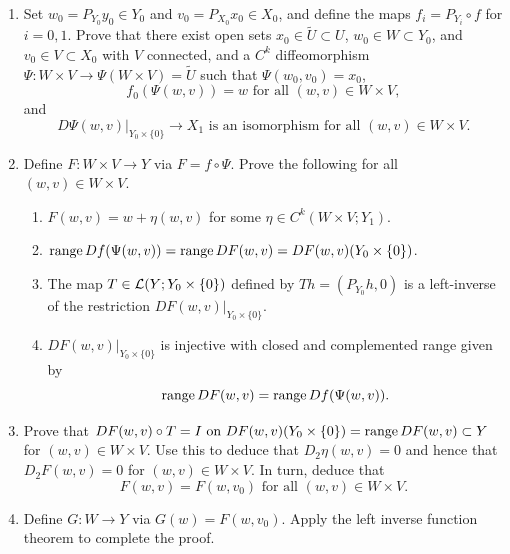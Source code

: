 \documentclass[a4paper]{article}
\begin{document}
\begin{enumerate}
\item Set $w_0 = P_{Y_0} y_0 \in Y_0$ and $v_0 = P_{X_0} 
x_0 \in X_0$, and define the maps $f_i = P_{Y_i} \circ f$ 
for $i=0,1$.  Prove that there exist open sets $x_0 \in 
\tilde{U} \subset U$, $w_0  \in W \subset Y_0$, and 
$v_0 \in V \subset X_0$ with $V$ connected, and a $C^k$ 
diffeomorphism $\Psi : W \times V \to \Psi(W\times V) = 
\tilde{U}$ such that $\Psi(w_0, v_0) = x_0$, 
\[ 
f_0(\Psi(w,v)) = w \text{ for all }(w,v) \in W \times V,   
\]
and 
\[ 
D\Psi(w,v) \vert_{Y_0 \times \{0\}} \to X_1 \text{ is an 
isomorphism for all } (w,v) \in W \times V.
\]

\item Define $F : W \times V \to Y$ via $F = f \circ \Psi$. 
Prove the following for all $(w,v) \in W \times V$.
\begin{enumerate}
\item $F(w,v) = w + \eta(w,v)$ for some $\eta \in C^k
(W \times V ; Y_1)$.
\item $\operatorname{range} Df(\Psi(w,v)) = \operatorname{range} DF(w,v) = DF(w,v)(Y_0 
\times \{0\})$.
\item The map  $T \in \mathcal{L}(Y ; Y_0 \times \{0\})$ defined 
by $Th = (P_{Y_0} h, 0)$ is a left-inverse of the restriction 
$DF(w,v) \vert_{Y_0 \times \{0\}}$.
\item $DF(w,v) \vert_{Y_0 \times \{0\}}$ is injective 
with closed and complemented range given by
\[
\operatorname{range} DF(w,v) = \operatorname{range} Df(\Psi(w,v)).
\]
\end{enumerate}

\item Prove that  $DF(w,v) \circ T = I \text{ on } 
DF(w,v)(Y_0 \times \{0\}) = \operatorname{range} DF(w,v) \subset Y$  
for $(w,v) \in W \times V$.  Use this to deduce that 
$D_2 \eta(w,v) =0$ and hence that $D_2 F(w,v) =0$ for 
$(w,v) \in W \times V$.  In turn, deduce that 
\[
F(w,v) = F(w,v_0) \text{ for all }(w,v) \in W \times V.
\]

\item Define $G: W \to Y$ via $G(w) = F(w,v_0)$.  
Apply the left inverse function theorem
to complete the proof.
  
  

\end{enumerate}
\end{document}
